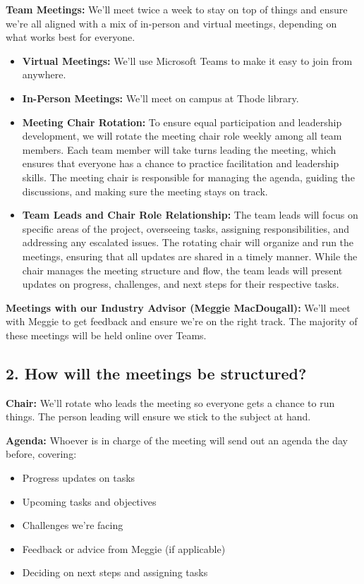 \documentclass{article}
\begin{document}
\textbf{Team Meetings:} We'll meet twice a week to stay on top of things and ensure we're all aligned with a mix of in-person and virtual meetings, depending on what works best for everyone.
\begin{itemize}
    \item \textbf{Virtual Meetings:} We’ll use Microsoft Teams to make it easy to join from anywhere.
    \item \textbf{In-Person Meetings:} We’ll meet on campus at Thode library.
    \item \textbf{Meeting Chair Rotation:}
    To ensure equal participation and leadership development, we will rotate the meeting chair role weekly among all team members. Each team member will take turns leading the meeting, which ensures that everyone has a chance to practice facilitation and leadership skills. The meeting chair is responsible for managing the agenda, guiding the discussions, and making sure the meeting stays on track.
    \item \textbf{Team Leads and Chair Role Relationship:}
    The team leads will focus on specific areas of the project, overseeing tasks, assigning responsibilities, and addressing any escalated issues. The rotating chair will organize and run the meetings, ensuring that all updates are shared in a timely manner. While the chair manages the meeting structure and flow, the team leads will present updates on progress, challenges, and next steps for their respective tasks.

\end{itemize}

\textbf{Meetings with our Industry Advisor (Meggie MacDougall):} We’ll meet with Meggie to get feedback and ensure we’re on the right track. The majority of these meetings will be held online over Teams.

\subsection*{2. How will the meetings be structured?}
\textbf{Chair:} We’ll rotate who leads the meeting so everyone gets a chance to run things. The person leading will ensure we stick to the subject at hand.

\textbf{Agenda:} Whoever is in charge of the meeting will send out an agenda the day before, covering:
\begin{itemize}
    \item Progress updates on tasks
    \item Upcoming tasks and objectives
    \item Challenges we’re facing
    \item Feedback or advice from Meggie (if applicable)
    \item Deciding on next steps and assigning tasks
\end{itemize}
\end{document}
